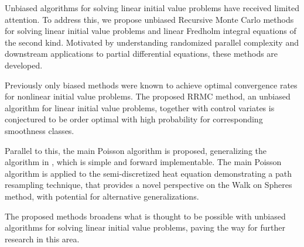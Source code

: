 Unbiased algorithms for solving linear initial value problems have received limited attention.
To address this, we propose unbiased Recursive Monte Carlo methods for solving
linear initial value problems and linear Fredholm integral equations of the second kind. Motivated
by understanding randomized parallel complexity and downstream applications to partial differential
equations, these methods are developed.

Previously only biased methods were known to achieve optimal convergence rates for nonlinear
initial value problems.
The proposed RRMC method, an unbiased algorithm for linear initial value problems,
together with control variates is conjectured to be order optimal with high
probability for corresponding smoothness classes.

Parallel to this, the main Poisson algorithm is proposed, generalizing the algorithm in \cite{acebron_monte_2016},
which is simple and forward implementable. The main Poisson algorithm is applied
to the semi-discretized heat equation demonstrating a path resampling technique, that provides
a novel perspective on the Walk on Spheres method, with potential for alternative generalizations.

The proposed methods broadens what is thought to be possible with unbiased algorithms for
solving linear initial value problems, paving the way for further research in this area.